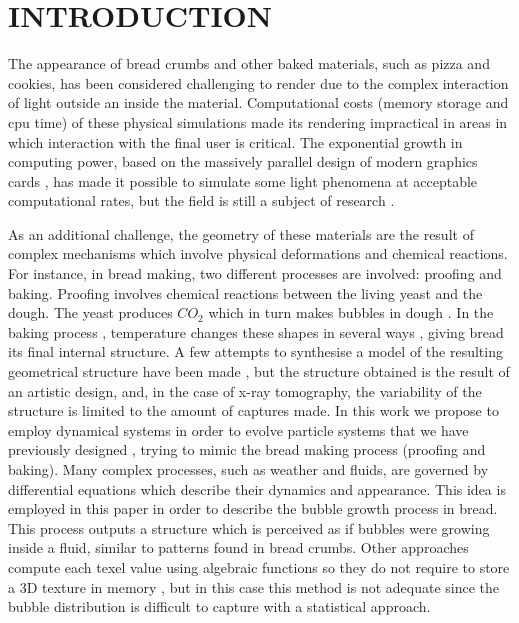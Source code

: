 \documentclass[oneside,a4paper,english,links]{amca}
\begin{document}
\section{INTRODUCTION}

The appearance of bread crumbs and other baked materials, such as
pizza and cookies, has been considered challenging to render due to
the complex interaction of light outside an inside the
material. Computational costs (memory storage and cpu time) of these
physical simulations made its rendering impractical in areas in which
interaction with the final user is critical. The exponential growth in
computing power, based on the massively parallel design of modern
graphics cards \citep{Yeo09,Harris06}, has made it possible to
simulate some light phenomena at acceptable computational rates, but
the field is still a subject of research \citep{Voglsam2013}.

As an additional challenge, the geometry of these materials are the
result of complex mechanisms which involve physical deformations and
chemical reactions. For instance, in bread making, two different
processes are involved: proofing and baking. Proofing involves
chemical reactions between the living yeast and the dough. The yeast
produces $CO_{2}$ which in turn makes bubbles in dough
\citep{Shah1998}. In the baking process \citep{Mondal2008},
temperature changes these shapes in several ways \citep{Scanlon2001},
giving bread its final internal structure. A few attempts to
synthesise a model of the resulting geometrical structure have been
made \citep{VanDyck2014,Cho2007}, but the structure obtained is the
result of an artistic design, and, in the case of x-ray tomography,
the variability of the structure is limited to the amount of captures
made. In this work we propose to employ dynamical systems
\citep{Strogatz2001} in order to evolve particle systems
\citep{Reeves83} that we have previously designed
\citep{Baravalle2011}, trying to mimic the bread making process
(proofing and baking). Many complex processes, such as weather and
fluids, are governed by differential equations which describe their
dynamics and appearance. This idea is employed in this paper in order
to describe the bubble growth process in bread. This process outputs a
structure which is perceived as if bubbles were growing inside a fluid,
similar to patterns found in bread crumbs. Other approaches compute
each texel value using algebraic functions so they do not require to
store a 3D texture in memory \citep{Perlin1989}, but in this case this
method is not adequate since the bubble distribution is difficult to
capture with a statistical approach.
\end{document}
